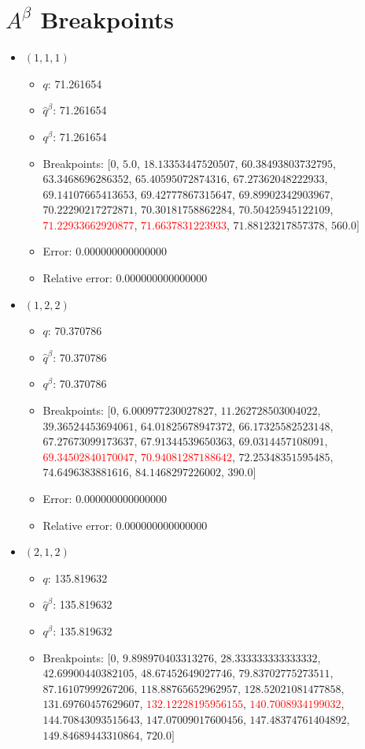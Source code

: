 \documentclass{article}%
\begin{document}
\section{$A^\beta$ Breakpoints}%
\thispagestyle{plain}%
\begin{itemize}%
	\item $(1, 1, 1)$%
	\begin{itemize}%
		\item $q$: 71.261654%
		\item $\hat{q}^\beta$: 71.261654%
		\item $q^\beta$: 71.261654%
		\item Breakpoints: $[$$0$, $5.0$, $18.13353447520507$, $60.38493803732795$, $63.3468696286352$, $65.40595072874316$, $67.27362048222933$, $69.14107665413653$, $69.42777867315647$, $69.89902342903967$, $70.22290217272871$, $70.30181758862284$, $70.50425945122109$, \textcolor{red}{$71.22933662920877$}, \textcolor{red}{$71.6637831223933$}, $71.88123217857378$, $560.0$$]$%
		\item Error: 0.000000000000000%
		\item Relative error: 0.000000000000000%
	\end{itemize}%
	\item $(1, 2, 2)$%
	\begin{itemize}%
		\item $q$: 70.370786%
		\item $\hat{q}^\beta$: 70.370786%
		\item $q^\beta$: 70.370786%
		\item Breakpoints: $[$$0$, $6.000977230027827$, $11.262728503004022$, $39.36524453694061$, $64.01825678947372$, $66.17325582523148$, $67.27673099173637$, $67.91344539650363$, $69.0314457108091$, \textcolor{red}{$69.34502840170047$}, \textcolor{red}{$70.94081287188642$}, $72.25348351595485$, $74.6496383881616$, $84.1468297226002$, $390.0$$]$%
		\item Error: 0.000000000000000%
		\item Relative error: 0.000000000000000%
	\end{itemize}%
	\item $(2, 1, 2)$%
	\begin{itemize}%
		\item $q$: 135.819632%
		\item $\hat{q}^\beta$: 135.819632%
		\item $q^\beta$: 135.819632%
		\item Breakpoints: $[$$0$, $9.898970403313276$, $28.333333333333332$, $42.69900440382105$, $48.67452649027746$, $79.83702775273511$, $87.16107999267206$, $118.88765652962957$, $128.52021081477858$, $131.69760457629607$, \textcolor{red}{$132.12228195956155$}, \textcolor{red}{$140.7008934199032$}, $144.70843093515643$, $147.07009017600456$, $147.48374761404892$, $149.84689443310864$, $720.0$$]$%

\end{itemize}
\end{itemize}
\end{document}
